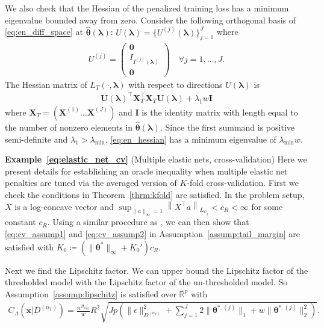 \documentclass[10pt]{book}
\theoremstyle{definition}
\begin{document}
	We also check that the Hessian of the penalized training loss has a minimum eigenvalue bounded away from zero.
	Consider the following orthogonal basis of \eqref{eq:en_diff_space} at $\hat{\boldsymbol{\theta}}(\boldsymbol{\lambda})$: $U(\boldsymbol{\lambda}) = \{U^{(j)}(\boldsymbol{\lambda})\}_{j = 1}^J$ where
	\begin{align}
	U^{(j)} =
	\left(
	\begin{matrix}
	\boldsymbol{0} \\
	I_{I^{(j)}(\boldsymbol \lambda)}\\
	\boldsymbol{0}
	\end{matrix}
	\right)
	\quad \forall j = 1,...,J.
	\end{align}
	The Hessian matrix of $L_T(\cdot, \boldsymbol{\lambda})$ with respect to directions $U(\boldsymbol{\lambda})$ is
	\begin{align}
	\boldsymbol U(\boldsymbol{\lambda})^\top \boldsymbol{X}_{T}^\top \boldsymbol{X}_{T} \boldsymbol U(\boldsymbol{\lambda}) + \lambda_1 w \boldsymbol{I}
	\label{eq:en_hessian}
	\end{align}
	where $\boldsymbol{X}_{T} = (\boldsymbol{X}^{(1)} ... \boldsymbol{X}^{(J)})$
	and $\boldsymbol{I}$ is the identity matrix with length equal to the number of nonzero elements in $\hat{\boldsymbol{\theta}}(\boldsymbol{\lambda})$.
	Since the first summand is positive semi-definite and $\lambda_1 > \lambda_{\min}$, \eqref{eq:en_hessian} has a minimum eigenvalue of $\lambda_{\min}w$.

\noindent\textbf{Example~\ref{eq:elastic_net_cv}} (Multiple elastic nets, cross-validation)
	Here we present details for establishing an oracle inequality when multiple elastic net penalties are tuned via the averaged version of $K$-fold cross-validation.
	First we check the conditions in Theorem~\ref{thrm:kfold} are satisfied.
	In the problem setup, $X$ is a log-concave vector and
	$
	\sup_{\|a\|_\infty = 1} \left\| X^\top a \right \|_{L_{\psi_2}} < c_R < \infty
	$
	for some constant $c_R$.
	Using a similar procedure as \citet{lecue2012oracle}, we can then show that \eqref{eq:cv_assump1} and \eqref{eq:cv_assump2} in Assumption~\ref{assump:tail_margin} are satisfied with
	$
	K_0 \coloneqq 
	(\|\boldsymbol{\theta}^*\|_\infty + K_0')
	c_R$.

	Next we find the Lipschitz factor.
	We can upper bound the Lipschitz factor of the thresholded model with the Lipschitz factor of the un-thresholded model.
	So Assumption~\ref{assump:lipschitz} is satisfied over $\mathbb{R}^p$ with
	\begin{align}
	C_\Lambda(\boldsymbol{x} | D^{(n_T)})
	=
	\frac{n^{2t_{\min}}}{w}
	R^2 \sqrt{
		J p
		\left(
		\|\epsilon\|_{D^{(n_T)}}^{2}
		+\sum_{j=1}^J
		2 \|\boldsymbol{\theta}^{*,(j)}\|_1
		+ w\|\boldsymbol{\theta}^{*,(j)}\|_2^2
		\right)
	}.
	\label{eq:elastic_lipschitz_cv}
	\end{align}
\end{document}
